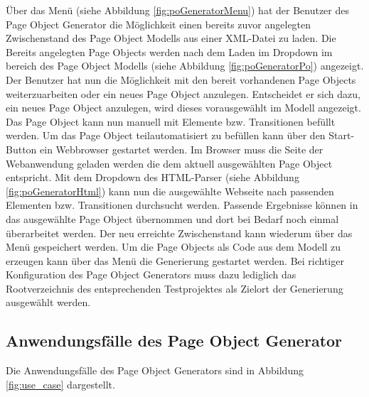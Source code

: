 Über das Menü (siehe Abbildung \ref{fig:poGeneratorMenu}) hat der Benutzer des Page Object Generator die Möglichkeit einen bereits zuvor angelegten Zwischenstand des Page Object Modells aus einer XML-Datei zu laden. Die Bereits angelegten Page Objects werden nach dem Laden im Dropdown im bereich des Page Object Modells (siehe Abbildung \ref{fig:poGeneratorPo}) angezeigt. Der Benutzer hat nun die Möglichkeit mit den bereit vorhandenen Page Objects weiterzuarbeiten oder ein neues Page Object anzulegen. Entscheidet er sich dazu, ein neues Page Object anzulegen, wird dieses vorausgewählt im Modell angezeigt. Das Page Object kann nun manuell mit Elemente bzw. Transitionen befüllt werden. Um das Page Object teilautomatisiert zu befüllen kann über den Start-Button ein Webbrowser gestartet werden. Im Browser muss die Seite der Webanwendung geladen werden die dem aktuell ausgewählten Page Object entspricht. Mit dem Dropdown des HTML-Parser (siehe Abbildung \ref{fig:poGeneratorHtml}) kann nun die ausgewählte Webseite nach passenden Elementen bzw. Transitionen durchsucht werden.
Passende Ergebnisse können in das ausgewählte Page Object übernommen und dort bei Bedarf noch einmal überarbeitet werden.
Der neu erreichte Zwischenstand kann wiederum über das Menü gespeichert werden.
Um die Page Objects als Code aus dem Modell zu erzeugen kann über das Menü die Generierung gestartet werden. Bei richtiger Konfiguration des Page Object Generators muss dazu lediglich das Rootverzeichnis des entsprechenden Testprojektes als Zielort der Generierung ausgewählt werden.


\subsection{Anwendungsfälle des Page Object Generator}
\label{sec:page_object_generator_usecases}

Die Anwendungsfälle des Page Object Generators sind in Abbildung \ref{fig:use_case} dargestellt.


